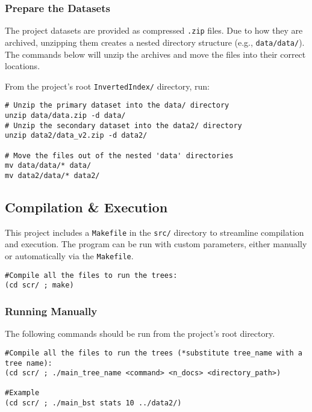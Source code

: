\subsubsection{Prepare the Datasets}

The project datasets are provided as compressed \texttt{.zip} files. Due to how they are archived, unzipping them creates a nested directory structure (e.g., \texttt{data/data/}). The commands below will unzip the archives and move the files into their correct locations.

From the project's root \texttt{InvertedIndex/} directory, run:
\begin{verbatim}
# Unzip the primary dataset into the data/ directory
unzip data/data.zip -d data/
# Unzip the secondary dataset into the data2/ directory
unzip data2/data_v2.zip -d data2/

# Move the files out of the nested 'data' directories
mv data/data/* data/
mv data2/data/* data2/
\end{verbatim}


\subsection{Compilation \& Execution}

This project includes a \texttt{Makefile} in the \texttt{src/} directory to streamline compilation and execution. The program can be run with custom parameters, either manually or automatically via the \texttt{Makefile}.


\begin{verbatim}
#Compile all the files to run the trees:
(cd scr/ ; make)
\end{verbatim}

\subsubsection{Running Manually}
The following commands should be run from the project’s root directory.
\begin{verbatim}
#Compile all the files to run the trees (*substitute tree_name with a tree name):
(cd scr/ ; ./main_tree_name <command> <n_docs> <directory_path>)

#Example
(cd scr/ ; ./main_bst stats 10 ../data2/)

\end{verbatim}

